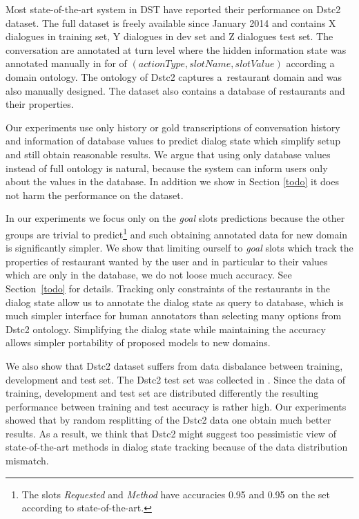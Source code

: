 \documentclass{itatnew}
\begin{document}
Most state-of-the-art system in DST have reported their performance on Dstc2 dataset\cite{dstc2henderson}. 
The full dataset is freely available since January 2014 and contains X dialogues in training set, Y dialogues in dev set and Z dialogues test set.
The conversation are annotated at turn level where the hidden information state was annotated manually in for of $(actionType, slotName, slotValue)$
according a domain ontology.
The ontology of Dstc2 captures a~restaurant domain and was also manually designed.
The dataset also contains a database of restaurants and their properties.

Our experiments use only history  or gold transcriptions of conversation history and information of database values to predict dialog state which simplify setup and still obtain reasonable results.
We argue that using only database values instead of full ontology is natural, because the system can inform users only about the values in the database.
In addition we show in Section \ref{todo} it does not harm the performance on the dataset.

In our experiments we focus only on the {\it goal} slots predictions because the other groups are trivial to predict\footnote{The slots {\it Requested} and {\it Method} have accuracies 0.95 and 0.95 on the set according to state-of-the-art\cite{JWilliams}.} and such obtaining annotated data for new domain is significantly simpler.
We show that limiting ourself to {\it goal} slots which track the properties of restaurant wanted by the user  and in particular to their values which are only in the database, we do not loose much accuracy.
See Section~\ref{todo} for details.
Tracking only constraints of the restaurants in the dialog state allow us to annotate the dialog state as query to database, which is much simpler interface for human annotators than selecting many options from Dstc2 ontology.
Simplifying the dialog state while maintaining the accuracy allows simpler portability of proposed models to new domains.

We also show that Dstc2 dataset suffers from data disbalance between training, development and test set.
The Dstc2 test set was collected in  \cite{dstc2henderson}.
Since the data of training, development and test set are distributed differently the resulting performance between training and test accuracy is rather high. 
Our experiments showed that by random resplitting of the Dstc2 data one obtain much better results.
As a result, we think that Dstc2 might suggest too pessimistic view of state-of-the-art methods in dialog state tracking because of the data distribution mismatch.
\end{document}
